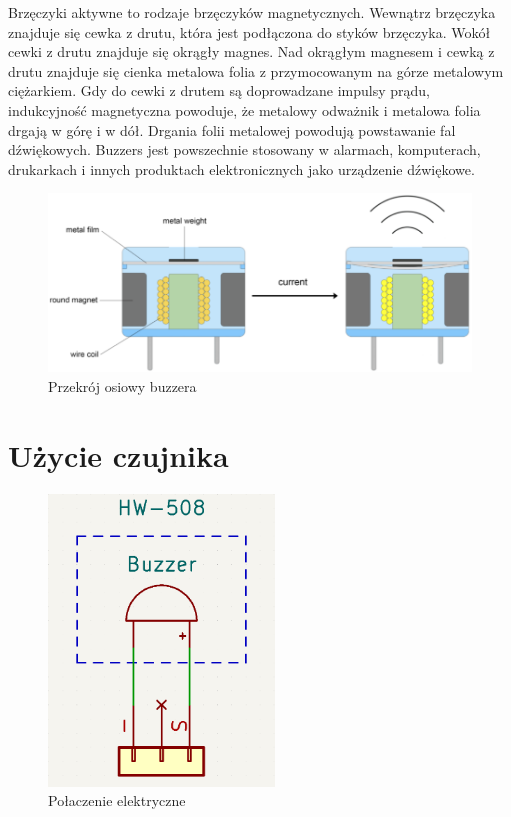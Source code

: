 \documentclass[11pt, a4paper]{article}
\begin{document}
Brzęczyki aktywne to rodzaje brzęczyków magnetycznych. Wewnątrz brzęczyka znajduje się cewka z drutu, która jest podłączona do styków brzęczyka. Wokół cewki z drutu znajduje się okrągły magnes. Nad okrągłym magnesem i cewką z drutu znajduje się cienka metalowa folia z przymocowanym na górze metalowym ciężarkiem. Gdy do cewki z drutem są doprowadzane impulsy prądu, indukcyjność magnetyczna powoduje, że metalowy odważnik i metalowa folia drgają w górę i w dół. Drgania folii metalowej powodują powstawanie fal dźwiękowych. Buzzers jest powszechnie stosowany w alarmach, komputerach, drukarkach i innych produktach elektronicznych jako urządzenie dźwiękowe.

\vspace{0.5cm}
\begin{figure}[h]
\centering
\includegraphics[width=.9\linewidth]{fig/obrazki/buzzer/przekroj.png}
\caption{Przekrój osiowy buzzera \cite{budowa}}
\label{fig:test}
\end{figure}
\vspace{0.5cm}

\section{Użycie czujnika}

\vspace{0.5cm}
\begin{figure}[h!]
    \centering
    \includegraphics[width=6cm]{fig/obrazki/buzzer/kicadBuzzer.png}
    \caption{Połaczenie elektryczne}
    \label{fig:my_label}
\end{figure}
\vspace{0.5cm}
\end{document}

